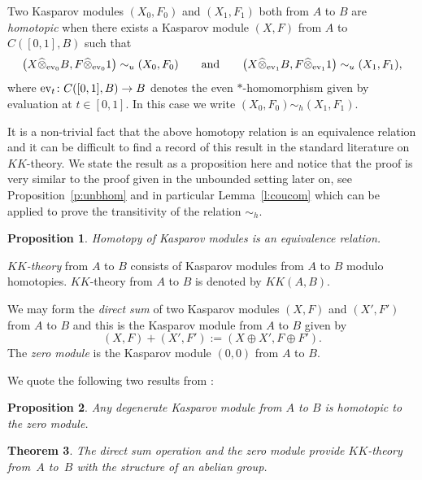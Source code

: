 \documentclass[pdftex]{sigma}
\numberwithin{equation}{section}
\newtheorem{Theorem}{Theorem}[section]
\newtheorem{prop}[Theorem]{Proposition}
 { \theoremstyle{definition}
\newtheorem{dfn}[Theorem]{Definition}
\newtheorem{exa}[Theorem]{Example}
\newtheorem{rem}[Theorem]{Remark} }
\newcommand{\hot}{\widehat \otimes}
\newcommand{\op}{\oplus}
\begin{document}
\begin{dfn}Two Kasparov modules $(X_0,F_0)$ and $(X_1,F_1)$ both from $A$ to $B$ are \emph{homotopic} when there exists a Kasparov module $(X,F)$ from $A$ to $C([0,1],B)$ such that
\[
\big(X \hot_{{\rm ev}_0} B,F \hot_{{\rm ev}_0} 1\big) \sim_u (X_0,F_0) \qquad \mbox{and} \qquad \big(X \hot_{{\rm ev}_1} B,F \hot_{{\rm ev}_1} 1\big) \sim_u (X_1,F_1) ,
\]
where ${\rm ev}_t\colon C( [0,1],B) \to B$ denotes the even $*$-homomorphism given by evaluation at $t \in [0,1]$. In this case we write $(X_0,F_0) \sim_h (X_1,F_1)$.
\end{dfn}

It is a non-trivial fact that the above homotopy relation is an equivalence relation and it can be difficult to find a record of this result in the standard literature on $KK$-theory. We state the result as a proposition here and notice that the proof is very similar to the proof given in the unbounded setting later on, see Proposition~\ref{p:unbhom} and in particular Lemma~\ref{l:coucom} which can be applied to prove the transitivity of the relation $\sim_h$.

\begin{prop}Homotopy of Kasparov modules is an equivalence relation.
\end{prop}

\begin{dfn}\emph{$KK$-theory} from $A$ to $B$ consists of Kasparov modules from $A$ to $B$ modulo homotopies. $KK$-theory from $A$ to $B$ is denoted by $KK(A,B)$.
\end{dfn}

We may form the \emph{direct sum} of two Kasparov modules $(X,F)$ and $(X',F')$ from $A$ to $B$ and this is the Kasparov module from $A$ to $B$ given by
\[
(X,F) + (X',F') := (X \op X', F \op F') .
\]
The \emph{zero module} is the Kasparov module $(0,0)$ from $A$ to $B$.

We quote the following two results from \cite[Chapter~17]{Bla:KOA}:

\begin{prop}\label{p:degbou}Any degenerate Kasparov module from $A$ to $B$ is homotopic to the zero module.
\end{prop}

\begin{Theorem}The direct sum operation and the zero module provide $KK$-theory from~$A$ to~$B$ with the structure of an abelian group.
\end{Theorem}
\end{document}

